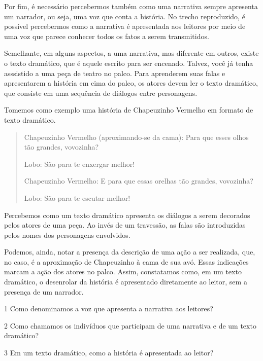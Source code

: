 {Por fim, é necessário percebermos também como uma narrativa sempre
apresenta um narrador, ou seja, uma voz que conta a história. No trecho
reproduzido, é possível percebermos como a narrativa é apresentada
aos leitores por meio de uma voz que parece conhecer todos os fatos a
serem transmitidos.

Semelhante, em alguns aspectos, a uma narrativa, mas diferente em outros, existe o texto dramático, que é aquele escrito para ser encenado. Talvez, você já tenha asssistido a uma peça de teatro no palco. Para aprenderem suas falas
e apresentarem a história em cima do palco, os atores devem ler o texto
dramático, que consiste em uma sequência de diálogos
entre personagens.

Tomemos como exemplo uma história de Chapeuzinho
Vermelho em formato de texto dramático.

\begin{quote}
Chapeuzinho Vermelho (aproximando-se da cama): Para que esses olhos
tão grandes, vovozinha?

Lobo: São para te enxergar melhor!

Chapeuzinho Vermelho: E para que essas orelhas tão grandes, vovozinha?

Lobo: São para te escutar melhor!
\end{quote}

Percebemos como um texto dramático apresenta os diálogos a serem
decorados pelos atores de uma peça. Ao invés de um travessão, as falas são introduzidas pelos nomes dos personagens envolvidos.

Podemos, ainda, notar a presença da descrição de uma ação a ser realizada, que,
no caso, é a aproximação de Chapeuzinho à cama de sua avó. Essas indicações marcam a ação dos atores no palco. Assim,
constatamos como, em um texto dramático, o desenrolar da história é
apresentado diretamente ao leitor, sem a presença de um narrador.}


\num{1} Como denominamos a voz que apresenta a narrativa aos leitores?


\num{2} Como chamamos os indivíduos que participam de uma narrativa e de um
texto dramático?


\num{3} Em um texto dramático, como a história é apresentada ao leitor?

